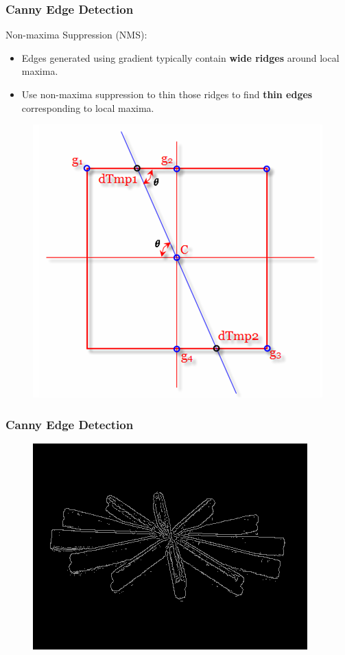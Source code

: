 \documentclass[notheorems,serif,table,compress]{beamer}  %
\begin{document}
\begin{frame}
\frametitle{Canny Edge Detection}
{\color{blue}Non-maxima Suppression (NMS):}
    \begin{itemize}
        \item Edges generated using gradient typically contain {\textbf{wide ridges}} around local maxima.
        \item Use non-maxima suppression to thin those ridges to find {\textbf{thin edges}} corresponding to local maxima.
    \end{itemize}
        \begin{figure}
        \includegraphics[width=0.4\linewidth]{nonmax.png} 
        \end{figure}
\end{frame}

\begin{frame}
\frametitle{Canny Edge Detection}
    \begin{figure}
    \includegraphics[width=0.7\linewidth]{nonResult.png} 
    \end{figure}
\end{frame}
\end{document}
